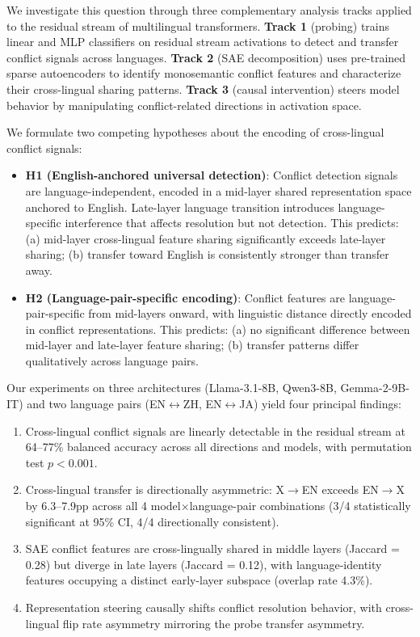 \documentclass{article}
\begin{document}
We investigate this question through three complementary analysis tracks applied to the residual stream of multilingual transformers. \textbf{Track 1} (probing) trains linear and MLP classifiers on residual stream activations to detect and transfer conflict signals across languages. \textbf{Track 2} (SAE decomposition) uses pre-trained sparse autoencoders to identify monosemantic conflict features and characterize their cross-lingual sharing patterns. \textbf{Track 3} (causal intervention) steers model behavior by manipulating conflict-related directions in activation space.

We formulate two competing hypotheses about the encoding of cross-lingual conflict signals:

\begin{itemize}
    \item \textbf{H1 (English-anchored universal detection)}: Conflict detection signals are language-independent, encoded in a mid-layer shared representation space anchored to English. Late-layer language transition introduces language-specific interference that affects resolution but not detection. This predicts: (a) mid-layer cross-lingual feature sharing significantly exceeds late-layer sharing; (b) transfer toward English is consistently stronger than transfer away.

    \item \textbf{H2 (Language-pair-specific encoding)}: Conflict features are language-pair-specific from mid-layers onward, with linguistic distance directly encoded in conflict representations. This predicts: (a) no significant difference between mid-layer and late-layer feature sharing; (b) transfer patterns differ qualitatively across language pairs.
\end{itemize}

Our experiments on three architectures (Llama-3.1-8B, Qwen3-8B, Gemma-2-9B-IT) and two language pairs (EN$\leftrightarrow$ZH, EN$\leftrightarrow$JA) yield four principal findings:

\begin{enumerate}
    \item Cross-lingual conflict signals are linearly detectable in the residual stream at 64--77\% balanced accuracy across all directions and models, with permutation test $p < 0.001$.
    \item Cross-lingual transfer is directionally asymmetric: X$\to$EN exceeds EN$\to$X by 6.3--7.9pp across all 4 model$\times$language-pair combinations (3/4 statistically significant at 95\% CI, 4/4 directionally consistent).
    \item SAE conflict features are cross-lingually shared in middle layers (Jaccard = 0.28) but diverge in late layers (Jaccard = 0.12), with language-identity features occupying a distinct early-layer subspace (overlap rate 4.3\%).
    \item Representation steering causally shifts conflict resolution behavior, with cross-lingual flip rate asymmetry mirroring the probe transfer asymmetry.
\end{enumerate}
\end{document}
